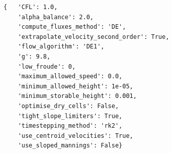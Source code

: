 \begin{verbatim}
{   'CFL': 1.0,
    'alpha_balance': 2.0,
    'compute_fluxes_method': 'DE',
    'extrapolate_velocity_second_order': True,
    'flow_algorithm': 'DE1',
    'g': 9.8,
    'low_froude': 0,
    'maximum_allowed_speed': 0.0,
    'minimum_allowed_height': 1e-05,
    'minimum_storable_height': 0.001,
    'optimise_dry_cells': False,
    'tight_slope_limiters': True,
    'timestepping_method': 'rk2',
    'use_centroid_velocities': True,
    'use_sloped_mannings': False}
\end{verbatim}
